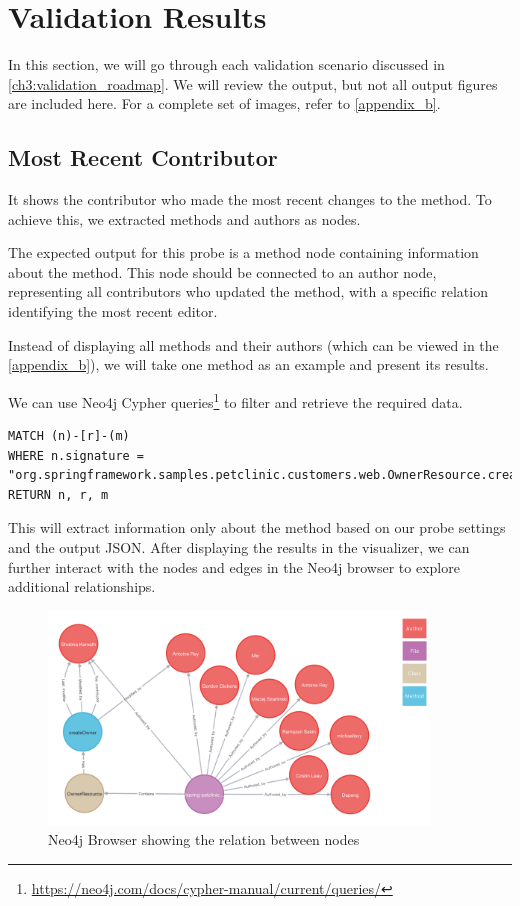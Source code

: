\section{Validation Results}

In this section, we will go through each validation scenario discussed in \autoref{ch3:validation_roadmap}. We will review the output, but not all output figures are included here. For a complete set of images, refer to \autoref{appendix_b}.

\subsection{Most Recent Contributor}
It shows the contributor who made the most recent changes to the method. To achieve this, we extracted methods and authors as nodes.

The expected output for this probe is a method node containing information about the method. This node should be connected to an author node, representing all contributors who updated the method, with a specific relation identifying the most recent editor.

Instead of displaying all methods and their authors (which can be viewed in the \autoref{appendix_b}), we will take one method as an example and present its results.

We can use Neo4j Cypher queries\footnote{\url{https://neo4j.com/docs/cypher-manual/current/queries/}} to filter and retrieve the required data.

\begin{lstlisting}
MATCH (n)-[r]-(m)
WHERE n.signature = "org.springframework.samples.petclinic.customers.web.OwnerResource.createOwner(org.springframework.samples.petclinic.customers.web.OwnerRequest)"
RETURN n, r, m
\end{lstlisting}

This will extract information only about the method based on our probe settings and the output JSON. After displaying the results in the visualizer, we can further interact with the nodes and edges in the Neo4j browser to explore additional relationships.

\begin{figure}[ht]
    \centering
    \includegraphics[width=0.9\textwidth]{figures/author_file_class_method_relation.png}
    \caption{Neo4j Browser showing the relation between nodes}
    \label{fig:scenerio_1_2_3_overview}
\end{figure}

